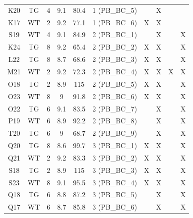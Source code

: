 \begin{landscape}
\begin{table}[]
{\begin{tabular}{@{}cccccccccc@{}}
		K20 & TG & 4 & 9.1 & 80.4 & 1 (PB\_BC\_5) &                 & X               &                  &                  \\
		K17 & WT & 2 & 9.2 & 77.1 & 1 (PB\_BC\_6) & X               & X               &                  &                  \\
		S19 & WT & 4 & 9.1 & 84.9 & 2 (PB\_BC\_1) &                 & X               &                  & X                \\
		K24 & TG & 8 & 9.2 & 65.4 & 2 (PB\_BC\_2) & X               & X               &                  & X                \\
		L22 & TG & 8 & 8.7 & 68.6 & 2 (PB\_BC\_3) & X               & X               &                  & X                \\
		M21 & WT & 2 & 9.2 & 72.3 & 2 (PB\_BC\_4) & X               & X               & X                & X                \\
		O18 & TG & 2 & 8.9 & 115  & 2 (PB\_BC\_5) & X               & X               &                  & X                \\
		O23 & WT & 8 & 9   & 91.8 & 2 (PB\_BC\_6) & X               & X               &                  & X                \\
		O22 & TG & 6 & 9.1 & 83.5 & 2 (PB\_BC\_7) &                 & X               &                  & X                \\
		P19 & WT & 6 & 8.9 & 92.2 & 2 (PB\_BC\_8) &                 & X               &                  & X                \\
		T20 & TG & 6 & 9   & 68.7 & 2 (PB\_BC\_9) &                 & X               &                  & X                \\
		Q20 & TG & 8 & 8.6 & 99.7 & 3 (PB\_BC\_1) & X               & X               &                  & X                \\
		Q21 & WT & 2 & 9.2 & 83.3 & 3 (PB\_BC\_2) & X               & X               &                  & X                \\
		S18 & TG & 2 & 8.9 & 115  & 3 (PB\_BC\_3) & X               & X               &                  & X                \\
		S23 & WT & 8 & 9.1 & 95.5 & 3 (PB\_BC\_4) & X               & X               &                  & X                \\
		Q18 & TG & 6 & 8.8 & 87.2 & 3 (PB\_BC\_5) &                 & X               &                  & X                \\
		Q17 & WT & 6 & 8.7 & 85.8 & 3 (PB\_BC\_6) &                 & X               &                  & X                \\

\end{tabular}}
\end{table}
\end{landscape}
